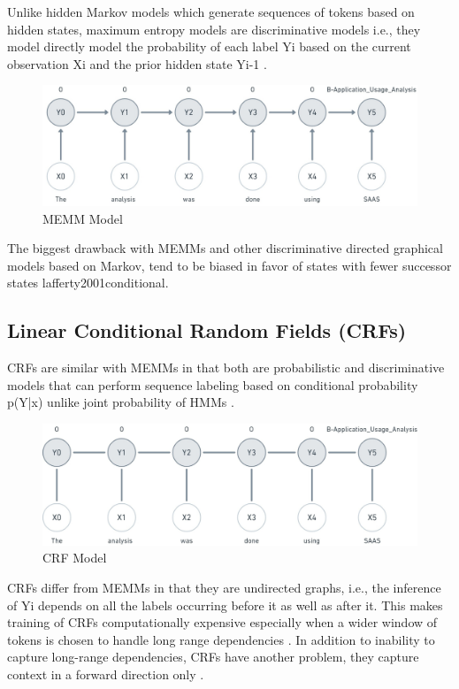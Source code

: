 Unlike hidden Markov models which generate sequences of tokens based on hidden states, maximum entropy models are discriminative models i.e., they model directly model the probability of each label Yi based on the current observation Xi and the prior hidden state Yi-1 \citep{mccallum2000maximum}. 

\begin{figure}[htbp]
	\centering
	\includegraphics[width=1\textwidth]{4.graphics/figures/ch_5/MEMM}
	\caption{MEMM Model}
	\label{fig:chapter03:setup}
\end{figure}

The biggest drawback with MEMMs and other discriminative directed graphical models based on Markov, tend to be biased in favor of states with fewer successor states {lafferty2001conditional}. 

\subsection{Linear Conditional Random Fields (CRFs)}
\label{sec:chapter05:MLModels:CRFs}

CRFs are similar with MEMMs in that both are probabilistic and discriminative models that can perform sequence labeling based on conditional probability p(Y|x) unlike joint probability of HMMs \citep{wallach2004conditional}. 

\begin{figure}[htbp]
	\centering
	\includegraphics[width=1\textwidth]{4.graphics/figures/ch_5/CRF}
	\caption{CRF Model}
	\label{fig:chapter03:setup}
\end{figure}

CRFs differ from MEMMs in that they are undirected graphs, i.e., the inference of Yi depends on all the labels occurring before it as well as after it. This makes training of CRFs computationally expensive especially when a wider window of tokens is chosen to handle long range dependencies \citep{aggarwal2018machine}. In addition to inability to capture long-range dependencies, CRFs have another problem, they capture context in a forward direction only \citep{lample2016neural}.



